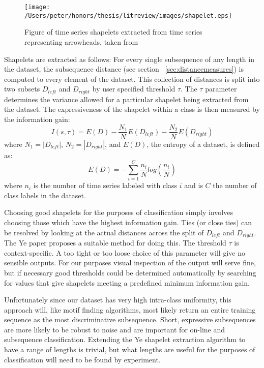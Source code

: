 	\begin{figure}[ht!]
		\label{fig:timeseriesshapelets}
		\centering
		\texttt{[image: /Users/peter/honors/thesis/litreview/images/shapelet.eps]}
		\caption{Figure of time series shapelets extracted from time series representing arrowheads, taken from \citet{ye2009time}}
	\end{figure}
	
	 Shapelets are extracted as follows: For every single subsequence of any length in the dataset, the subsequence distance (see section ~\ref{sec:distancemeasures}) is computed to every element of the dataset. This collection of distances is split into two subsets $D_{left}$ and $D_{right}$ by user specified threshold $\tau$. The $\tau$ parameter determines the variance allowed for a particular shapelet being extracted from the dataset. The expressiveness of the shapelet within a class is then measured by the information gain:
	\begin{equation}
		I(s,\tau) = E(D) - \frac{N_{1}}{N}E(D_{left}) - \frac{N_{2}}{N}E(D_{right})
	\end{equation}
	where $N_{1} = |D_{left}|$, $N_{2} = |D_{right}|$, and $E(D)$, the entropy of a dataset, is defined as:
	\begin{equation}
		E(D) = -\sum^{C}_{i=1}\frac{n_{i}}{N}log(\frac{n_{i}}{N})
	\end{equation}
	where $n_{i}$ is the number of time series labeled with class $i$ and is $C$ the number of class labels in the dataset.
	
	Choosing good shapelets for the purposes of classification simply involves choosing those which have the highest information gain. Ties (or close ties) can be resolved by looking at the actual distances across the split of $D_{left}$ and $D_{right}$. The Ye paper proposes a suitable method for doing this. The threshold $\tau$ is context-specific. A too tight or too loose choice of this parameter will give no sensible outputs. For our purposes visual inspection of the output will serve fine, but if necessary good thresholds could be determined automatically by searching for values that give shapelets meeting a predefined minimum information gain.
	
	Unfortunately since our dataset has very high intra-class uniformity, this approach will, like motif finding algorithms,  most likely return an entire training sequence as the most discriminative subsequence. Short, expressive subsequences are more likely to be robust to noise and are important for on-line and subsequence classification. Extending the Ye shapelet extraction algorithm to have a range of lengths is trivial, but what lengths are useful for the purposes of classification will need to be found by experiment.
	
